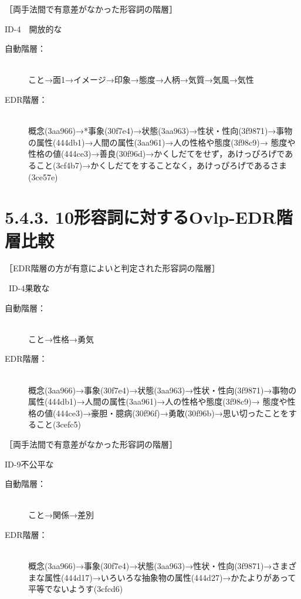 \documentclass[japanese]{jnlp_1.4}
\begin{document}
\noindent
［両手法間で有意差がなかった形容詞の階層］

\noindent
ID-4　開放的な
\begin{description}
\item[自動階層：]\mbox{}\\
こと→面1→イメージ→印象→態度→人柄→気質→気風→気性
\item[EDR階層：]\mbox{}\\
概念(3aa966)→*事象(30f7e4)→状態(3aa963)→性状・性向(3f9871)→事物の属性(444db1)→人間の属性(3aa961)→人の性格や態度(3f98c9)→
態度や性格の値(444ce3)→善良(30f96d)→かくしだてをせず，あけっぴろげであること(3cf4b7)→かくしだてをすることなく，あけっぴろげであるさま(3ce57e)
\end{description}



\section{5.4.3.   10形容詞に対するOvlp-EDR階層比較}

\noindent
［EDR階層の方が有意によいと判定された形容詞の階層］

\noindent\
ID-4果敢な
\begin{description}
\item[自動階層：]\mbox{}\\
こと→性格→勇気
\item[EDR階層：]\mbox{}\\
概念(3aa966)→事象(30f7e4)→状態(3aa963)→性状・性向(3f9871)→事物の属性(444db1)→人間の属性(3aa961)→人の性格や態度(3f98c9)→
態度や性格の値(444ce3)→豪胆・臆病(30f96f)→勇敢(30f96b)→思い切ったことをすること(3cefc5)
\end{description}

\noindent
［両手法間で有意差がなかった形容詞の階層］

\noindent
ID-9不公平な
\begin{description}
\item[自動階層：]\mbox{}\\
こと→関係→差別
\item[EDR階層：]\mbox{}\\
概念(3aa966)→事象(30f7e4)→状態(3aa963)→性状・性向(3f9871)→さまざまな属性(444d17)→いろいろな抽象物の属性(444d27)→かたよりがあって平等でないようす(3cfcd6)
\end{description}
\end{document}
